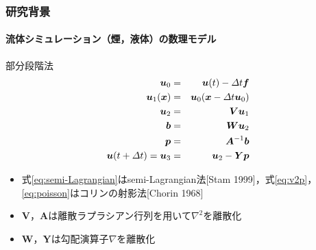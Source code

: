 \documentclass[aspectratio=169,dvipdfmx,hyperref={bookmarks=true}]{beamer}
\begin{document}
  \begin{frame}
  \frametitle{研究背景}
  \framesubtitle{流体シミュレーション（煙，液体）の数理モデル}
    \begin{block}{部分段階法}
\begin{eqnarray}
	\bm{u}_0			&=&  \bm{u} (t)  - \varDelta t \bm{f}\notag \\ 
	\bm{u}_1(\bm{x}) 	&=& \bm{u}_0(\bm{x}  - \varDelta t \bm{u}_0)\label{eq:semi-Lagrangian}\\
	\bm{u}_2   		&=&  \bm{V}\bm{u}_1		\notag\\
	\bm{b} 			&=& \bm{W}\bm{u}_2		 \label{eq:v2p}	\\ 
	\bm{p} 			&=& \bm{A}^{-1}\bm{b}	\label{eq:poisson} \\ 
	\bm{u} (t + \varDelta t) = \bm{u}_3  	&=& \bm{u}_2 - \bm{Y}\bm{p}\notag
\end{eqnarray}

\begin{itemize}
\item 式\ref{eq:semi-Lagrangian}はsemi-Lagrangian法[Stam 1999]，式\ref{eq:v2p}，\ref{eq:poisson}はコリンの射影法[Chorin 1968]
\item $\bm{V}$，$\bm{A}$は離散ラプラシアン行列を用いて$\nabla^2$を離散化
\item $\bm{W}$，$\bm{Y}$は勾配演算子$\nabla$を離散化
\end{itemize}
\end{block}
\end{frame}
\end{document}
